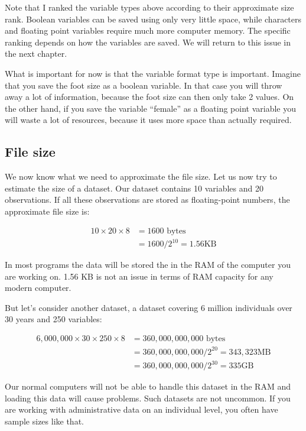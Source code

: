\documentclass[
]{book}
\begin{document}
Note that I ranked the variable types above according to their approximate size rank. Boolean variables can be saved using only very little space, while characters and floating point variables require much more computer memory. The specific ranking depends on how the variables are saved. We will return to this issue in the next chapter.

What is important for now is that the variable format type is important. Imagine that you save the foot size as a boolean variable. In that case you will throw away a lot of information, because the foot size can then only take 2 values. On the other hand, if you save the variable ``female'' as a floating point variable you will waste a lot of resources, because it uses more space than actually required.

\hypertarget{file-size}{%
\subsection*{File size}\label{file-size}}

We now know what we need to approximate the file size.
Let us now try to estimate the size of a dataset. Our dataset contains 10 variables and 20 observations. If all these observations are stored as floating-point numbers, the approximate file size is:

\begin{align}
10\times20\times8&=1600\text{ bytes} \nonumber\\
&=1600/2^{10}=1.56 \text{KB}\nonumber
\end{align}

In most programs the data will be stored the in the RAM of the computer you are working on. 1.56 KB is not an issue in terms of RAM capacity for any modern computer.

But let's consider another dataset, a dataset covering 6 million individuals over 30 years and 250 variables:

\begin{align}
6,000,000\times 30 \times250 \times8&=360,000,000,000\text{ bytes} \nonumber\\
&=360,000,000,000/2^{20}= 343,323 \text{MB}\nonumber\\
&=360,000,000,000/2^{30}= 335 \text{GB}\nonumber
\end{align}

Our normal computers will not be able to handle this dataset in the RAM and loading this data will cause problems. Such datasets are not uncommon. If you are working with administrative data on an individual level, you often have sample sizes like that.
\end{document}
